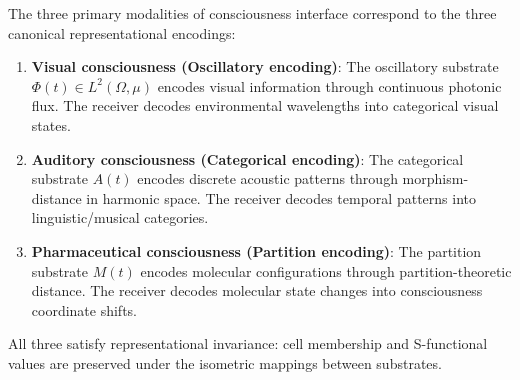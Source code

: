 \begin{theorem}
\label{thm:modality-rep}
The three primary modalities of consciousness interface correspond to the three canonical representational encodings:

\begin{enumerate}[label=(\alph*),leftmargin=*]
\item \textbf{Visual consciousness (Oscillatory encoding)}:
The oscillatory substrate $\Phi(t) \in L^2(\Omega,\mu)$ encodes visual information through continuous photonic flux. The receiver decodes environmental wavelengths into categorical visual states.

\item \textbf{Auditory consciousness (Categorical encoding)}:
The categorical substrate $A(t)$ encodes discrete acoustic patterns through morphism-distance in harmonic space. The receiver decodes temporal patterns into linguistic/musical categories.

\item \textbf{Pharmaceutical consciousness (Partition encoding)}:
The partition substrate $M(t)$ encodes molecular configurations through partition-theoretic distance. The receiver decodes molecular state changes into consciousness coordinate shifts.
\end{enumerate}

All three satisfy representational invariance: cell membership and S-functional values are preserved under the isometric mappings between substrates.
\end{theorem}

